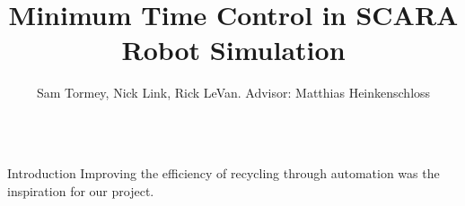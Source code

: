 \documentclass[final]{beamer}
\title[Fancy Posters]{Minimum Time Control in SCARA Robot Simulation}
\author{Sam Tormey, Nick Link, Rick LeVan. Advisor: Matthias Heinkenschloss}
\institute{Department of Computational and Applied Mathematics, Rice University}
\begin{document}
        \begin{frame}{}
        
        \vfill
		\vspace{0cm}
{\footnotesize
\begin{columns}[t]
        
\hspace{0.7cm}
\begin{column}{.30\linewidth}
                
\begin{block}{\centering Introduction}
Improving the efficiency of recycling through automation was the inspiration for our project.    \\



\end{block}
\end{column}
\end{columns}}
\end{frame}
\end{document}
